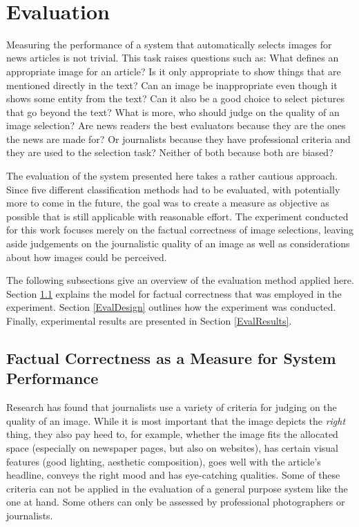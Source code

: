 \documentclass[11pt,a4paper,twoside]{article}
\begin{document}
\


\cleardoublepage

\section{Evaluation} \label{Eval}

Measuring the performance of a system that automatically selects images for news articles is not trivial. This task raises questions such as: What defines an appropriate image for an article? Is it only appropriate to show things that are mentioned directly in the text? Can an image be inappropriate even though it shows some entity from the text? Can it also be a good choice to select pictures that go beyond the text? What is more, who should judge on the quality of an image selection? Are news readers the best evaluators because they are the ones the news are made for? Or journalists because they have professional criteria and they are used to the selection task? Neither of both because both are biased?

The evaluation of the system presented here takes a rather cautious approach. Since five different classification methods had to be evaluated, with potentially more to come in the future, the goal was to create a measure as objective as possible that is still applicable with reasonable effort. The experiment conducted for this work focuses merely on the factual correctness of image selections, leaving aside judgements on the journalistic quality of an image as well as considerations about how images could be perceived.

The following subsections give an overview of the evaluation method applied here. Section \ref{EvalFacts} explains the model for factual correctness that was employed in the experiment. Section \ref{EvalDesign} outlines how the experiment was conducted. Finally, experimental results are presented in Section \ref{EvalResults}.

\subsection{Factual Correctness as a Measure for System Performance} \label{EvalFacts}

Research has found that journalists use a variety of criteria for judging on the quality of an image. While it is most important that the image depicts the \emph{right} thing, they also pay heed to, for example, whether the image fits the allocated space (especially on newspaper pages, but also on websites), has certain visual features (good lighting, aesthetic composition), goes well with the article's headline, conveys the right mood and has eye-catching qualities. \cite[p. 108]{Westman2006ImageContext} Some of these criteria can not be applied in the evaluation of a general purpose system like the one at hand. Some others can only be assessed by professional photographers or journalists.
\end{document}

